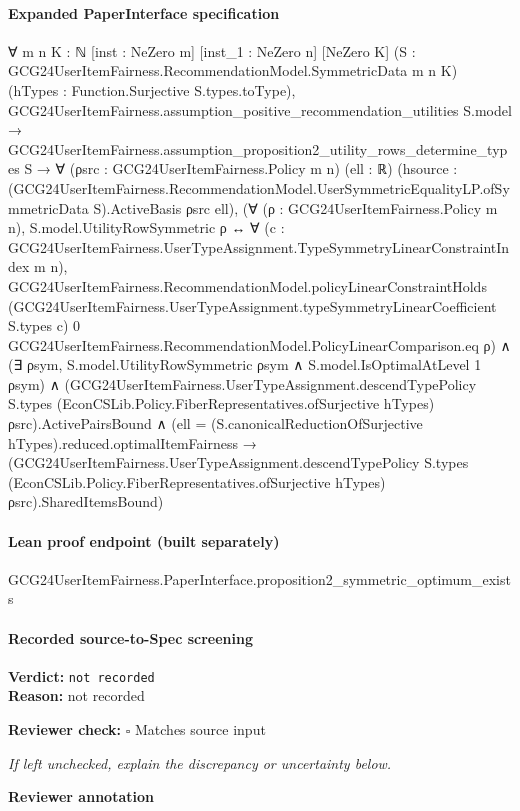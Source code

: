 \documentclass[10pt]{article}
\newcommand{\reviewerbox}{%
  \par\noindent\fbox{\parbox{0.96\linewidth}{\rule{0pt}{0.38in}}}\par
}
\newcommand{\reviewmatch}[1]{%
  \par\noindent\textbf{Reviewer check:} $\square$\; #1\par
  \noindent\emph{If left unchecked, explain the discrepancy or uncertainty below.}\par
}
\begin{document}
\paragraph{Expanded PaperInterface specification}
\begin{ReviewVerbatim}
∀ {m n K : ℕ} [inst : NeZero m] [inst_1 : NeZero n] [NeZero K]
  (S : GCG24UserItemFairness.RecommendationModel.SymmetricData m n K) (hTypes : Function.Surjective S.types.toType),
  GCG24UserItemFairness.assumption_positive_recommendation_utilities S.model →
    GCG24UserItemFairness.assumption_proposition2_utility_rows_determine_types S →
      ∀ (ρsrc : GCG24UserItemFairness.Policy m n) (ell : ℝ)
        (hsource :
          (GCG24UserItemFairness.RecommendationModel.UserSymmetricEqualityLP.ofSymmetricData S).ActiveBasis ρsrc ell),
        (∀ (ρ : GCG24UserItemFairness.Policy m n),
            S.model.UtilityRowSymmetric ρ ↔
              ∀ (c : GCG24UserItemFairness.UserTypeAssignment.TypeSymmetryLinearConstraintIndex m n),
                GCG24UserItemFairness.RecommendationModel.policyLinearConstraintHolds
                  (GCG24UserItemFairness.UserTypeAssignment.typeSymmetryLinearCoefficient S.types c) 0
                  GCG24UserItemFairness.RecommendationModel.PolicyLinearComparison.eq ρ) ∧
          (∃ ρsym, S.model.UtilityRowSymmetric ρsym ∧ S.model.IsOptimalAtLevel 1 ρsym) ∧
            (GCG24UserItemFairness.UserTypeAssignment.descendTypePolicy S.types
                  (EconCSLib.Policy.FiberRepresentatives.ofSurjective hTypes) ρsrc).ActivePairsBound ∧
              (ell = (S.canonicalReductionOfSurjective hTypes).reduced.optimalItemFairness →
                (GCG24UserItemFairness.UserTypeAssignment.descendTypePolicy S.types
                    (EconCSLib.Policy.FiberRepresentatives.ofSurjective hTypes) ρsrc).SharedItemsBound)
\end{ReviewVerbatim}

\paragraph{Lean proof endpoint (built separately)}\begin{ReviewVerbatim}
GCG24UserItemFairness.PaperInterface.proposition2_symmetric_optimum_exists
\end{ReviewVerbatim}

\paragraph{Recorded source-to-Spec screening}
\textbf{Verdict:} \texttt{not recorded}
\\
\textbf{Reason:} not recorded
\reviewmatch{Matches source input}
\noindent\textbf{Reviewer annotation}\par
\reviewerbox
\clearpage
\hypertarget{source-claim-fe2438fd53f645e4}{}
\end{document}
